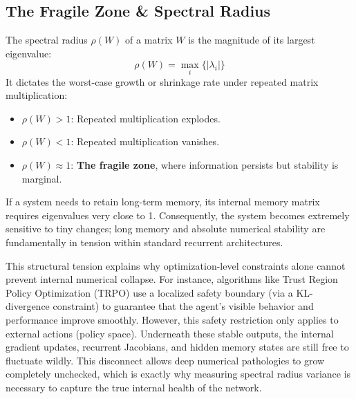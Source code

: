 \documentclass[11pt,a4paper]{article}
\begin{document}
\subsection{The Fragile Zone \& Spectral Radius}
The spectral radius $\rho(W)$ of a matrix $W$ is the magnitude of its largest eigenvalue:
$$\rho(W) = \max_{i} \{|\lambda_i|\}$$
It dictates the worst-case growth or shrinkage rate under repeated matrix multiplication:
\begin{itemize}
    \item $\rho(W) > 1$: Repeated multiplication explodes.
    \item $\rho(W) < 1$: Repeated multiplication vanishes.
    \item $\rho(W) \approx 1$: \textbf{The fragile zone}, where information persists but stability is marginal.
\end{itemize}
If a system needs to retain long-term memory, its internal memory matrix requires eigenvalues very close to 1. Consequently, the system becomes extremely sensitive to tiny changes; long memory and absolute numerical stability are fundamentally in tension within standard recurrent architectures.

This structural tension explains why optimization-level constraints alone cannot prevent internal numerical collapse. For instance, algorithms like Trust Region Policy Optimization (TRPO) use a localized safety boundary (via a KL-divergence constraint) to guarantee that the agent's visible behavior and performance improve smoothly. However, this safety restriction only applies to external actions (policy space). Underneath these stable outputs, the internal gradient updates, recurrent Jacobians, and hidden memory states are still free to fluctuate wildly. This disconnect allows deep numerical pathologies to grow completely unchecked, which is exactly why measuring spectral radius variance is necessary to capture the true internal health of the network.
\end{document}
